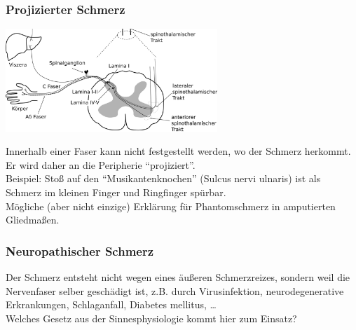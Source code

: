 \documentclass{beamer}
\begin{document}
\begin{frame}
\frametitle{Projizierter Schmerz}
 
\begin{center}
\includegraphics[width=0.6\textwidth]{Schmerz_aufsteigend_bis_Rueckenmark.png}
\end{center}

Innerhalb einer Faser kann nicht festgestellt werden, wo der Schmerz herkommt. Er wird daher an die Peripherie ``projiziert''.\\ 

Beispiel: Stoß auf den ``Musikantenknochen'' (Sulcus nervi ulnaris) ist als Schmerz im kleinen Finger und Ringfinger spürbar.  \\

Mögliche (aber nicht einzige) Erklärung für Phantomschmerz in amputierten Gliedmaßen. 




\end{frame}


\begin{frame}
\frametitle{Neuropathischer Schmerz}

Der Schmerz entsteht nicht wegen eines äußeren Schmerzreizes, sondern weil die Nervenfaser selber geschädigt ist, z.B. durch Virusinfektion, neurodegenerative Erkrankungen, Schlaganfall,  Diabetes mellitus, \dots  \\[1cm]


Welches Gesetz aus der Sinnesphysiologie kommt hier zum Einsatz?  \\[0.5 cm]




\end{frame}
\end{document}

